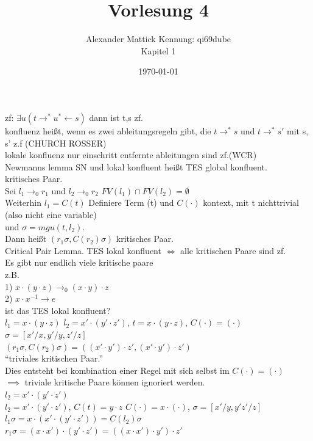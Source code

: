 \documentclass{article}
\author{
Alexander Mattick Kennung: qi69dube\\
Kapitel 1
}
\date{\today}
\title{Vorlesung 4}
\begin{document}
	\maketitle
	zf: $\exists u ( t\to^* u ^*\gets s)$ dann ist t,s zf.\\
	konfluenz heißt, wenn es zwei ableitungsregeln gibt, die $t\to^* s$ und $t\to^* s'$ mit s, s' z.f (CHURCH ROSSER)\\
	lokale konfluenz nur einschritt entfernte ableitungen sind zf.(WCR)\\
	Newmanns lemma SN und lokal konfluent heißt TES global konfluent.\\
	kritisches Paar.\\
	Sei $l_1\to_0 r_1$ und $l_2\to_0 r_2$ $FV(l_1)\cap FV(l_2)=\emptyset$\\
	Weiterhin $l_1 = C(t)$ Definiere Term (t) und $C(\cdot)$ kontext, mit t nichttrivial (also nicht eine variable)\\
	und $\sigma = mgu(t,l_2)$.\\
	Dann heißt $(r_1\sigma, C(r_2)\sigma)$ kritisches Paar.\\
	Critical Pair Lemma. TES lokal konfluent $\iff$ alle kritischen Paare sind zf.\\
	Es gibt nur endlich viele kritische paare\\
	z.B.\\
	1) $x\cdot (y\cdot z)\to_0 (x\cdot y)\cdot z$\\
	2) $x\cdot x^{-1} \to e$\\
	ist das TES lokal konfluent?\\
	$l_1 = x\cdot (y\cdot z) $ $l_2 = x'\cdot (y'\cdot z')$, $t=x\cdot (y\cdot z)$, $C(\cdot)=(\cdot)$ $\sigma = [x'/x,y'/y,z'/z]$\\
	$(r_1\sigma, C(r_2)\sigma)=((x'\cdot y')\cdot z', (x'\cdot y')\cdot z')$\\
	``triviales kritischen Paar.''\\
	Dies entsteht bei kombination einer Regel mit sich selbst im $C(\cdot)=(\cdot)$\\
	$\implies$ triviale kritische Paare können ignoriert werden.\\
	$l_2 = x'\cdot (y'\cdot z')$\\
	$l_2 = x'\cdot (y'\cdot z')$, $C(t) = y\cdot z$ $C(\cdot)=x\cdot (\cdot)$, $\sigma = [x'/y, y'z'/z]$\\
	$l_1\sigma = x\cdot (x'\cdot(y'\cdot z')) = C(l_2)\sigma$\\
	$r_1\sigma = (x\cdot x')\cdot (y'\cdot z') = ((x\cdot x')\cdot y')\cdot z'$\\
\end{document}

